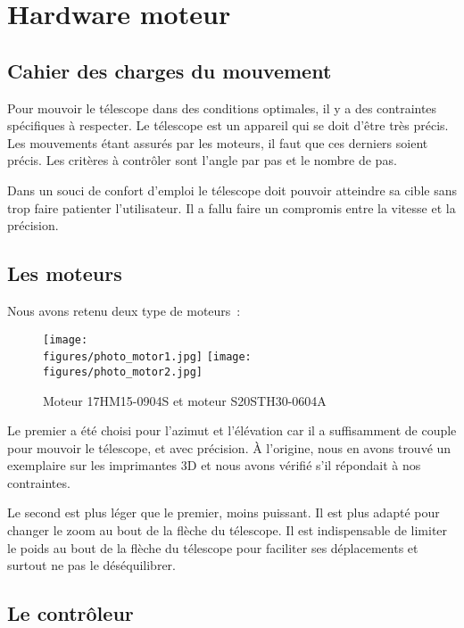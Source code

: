 \chapter{Hardware moteur}

\section{Cahier des charges du mouvement}

Pour mouvoir le télescope dans des conditions optimales, il y a des contraintes spécifiques à respecter. Le télescope est un appareil qui se doit d'être très précis. Les mouvements étant assurés par les moteurs, il faut que ces derniers soient précis. Les critères à contrôler sont l'angle par pas et le nombre de pas.

Dans un souci de confort d'emploi le télescope doit pouvoir atteindre sa cible sans trop faire patienter l'utilisateur. Il a fallu faire un compromis entre la vitesse et la précision.

\section{Les moteurs}

Nous avons retenu deux type de moteurs~:

\begin{figure}[H]
    \centering
    \texttt{[image: \\figures/photo\_motor1.jpg]}
    \texttt{[image: \\figures/photo\_motor2.jpg]}
    \decoRule
    \caption[
    Moteur 17HM15-0904S et moteur S20STH30-0604A]{
    Moteur 17HM15-0904S et moteur S20STH30-0604A}
    \label{fig:Moteur 17HM15-0904S et moteur S20STH30-0604A}
    \end{figure}

Le premier a été choisi pour l'azimut et l'élévation car il a suffisamment de couple pour mouvoir le télescope, et avec précision. À l'origine, nous en avons trouvé un exemplaire sur les imprimantes 3D et nous avons vérifié s'il répondait à nos contraintes.

Le second est plus léger que le premier, moins puissant. Il est plus adapté pour changer le zoom au bout de la flèche du télescope. Il est indispensable de limiter le poids au bout de la flèche du télescope pour faciliter ses déplacements et surtout ne pas le déséquilibrer.

\section{Le contrôleur}


